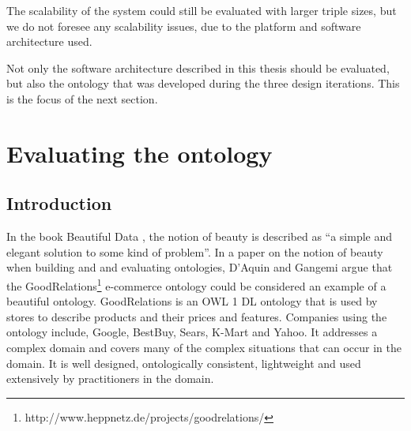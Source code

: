 The scalability of the system could still be evaluated with larger triple sizes, but we do not foresee any scalability issues, due to the platform and software architecture used. 

Not only the software architecture described in this thesis should be evaluated, but also the ontology that was developed during the three design iterations. This is the focus of the next section.





\section{Evaluating the ontology}

\subsection{Introduction}

% 

In the book Beautiful Data \cite{Segaran2009}, the notion of beauty is described as ``a simple and elegant solution to some kind of problem''. In a paper on the notion of beauty when building and and evaluating ontologies, D'Aquin and Gangemi \cite{DAquin2011} argue that the GoodRelations\footnote{http://www.heppnetz.de/projects/goodrelations/}\label{goodrelations} e-commerce ontology could be considered an example of a beautiful ontology. GoodRelations is an \ac{OWL} 1 DL ontology that is used by stores to describe products and their prices and features. Companies using the ontology include, Google, BestBuy, Sears, K-Mart and Yahoo. It addresses a complex domain and covers many of the complex situations that can occur in the domain. It is well designed, ontologically consistent, lightweight and used extensively by practitioners in the domain. 

